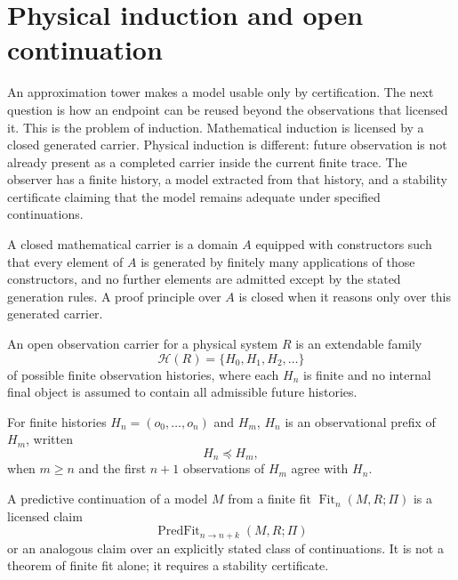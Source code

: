 \section{Physical induction and open continuation}
\label{sec:physical-induction-open-continuation}

An approximation tower makes a model usable only by certification. The next question is how an endpoint can be reused beyond the observations that licensed it. This is the problem of induction. Mathematical induction is licensed by a closed generated carrier. Physical induction is different: future observation is not already present as a completed carrier inside the current finite trace. The observer has a finite history, a model extracted from that history, and a stability certificate claiming that the model remains adequate under specified continuations.

\begin{definition}
\label{def:closed-mathematical-carrier}
A closed mathematical carrier is a domain $A$ equipped with constructors such that every element of $A$ is generated by finitely many applications of those constructors, and no further elements are admitted except by the stated generation rules. A proof principle over $A$ is closed when it reasons only over this generated carrier.
\end{definition}

\begin{definition}
\label{def:open-observation-carrier}
An open observation carrier for a physical system $R$ is an extendable family
$$
\mathcal H(R)=\{H_0,H_1,H_2,\ldots\}
$$
of possible finite observation histories, where each $H_n$ is finite and no internal final object is assumed to contain all admissible future histories.
\end{definition}

\begin{definition}
\label{def:observational-prefix}
For finite histories $H_n=(o_0,\ldots,o_n)$ and $H_m$, $H_n$ is an observational prefix of $H_m$, written
$$
H_n\preceq H_m,
$$
when $m\geq n$ and the first $n+1$ observations of $H_m$ agree with $H_n$.
\end{definition}

\begin{definition}
\label{def:predictive-continuation}
A predictive continuation of a model $M$ from a finite fit $\operatorname{Fit}_n(M,R;\Pi)$ is a licensed claim
$$
\operatorname{PredFit}_{n\to n+k}(M,R;\Pi)
$$
or an analogous claim over an explicitly stated class of continuations. It is not a theorem of finite fit alone; it requires a stability certificate.
\end{definition}

